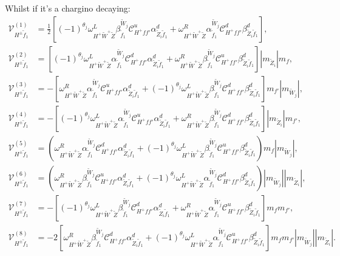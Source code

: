 \documentclass[final,3p,times,pdflatex]{elsarticle}
\begin{document}
Whilst if it's a chargino decaying:
\begin{align}
\mathcal{V}_{H^{\pm} \tilde{f}_1}^{(1)} &= \frac{1}{2}[(-1)^{\theta_j} \omega_{H^+ \tilde{W}^+ \tilde{Z}}^L \beta_{\tilde{f}_1}^{\tilde{W}_j} \mathcal{C}_{H^+ f f'}^u \alpha_{\tilde{Z}_i \tilde{f}_1}^{d} + \omega_{H^+ \tilde{W}^+ \tilde{Z}}^R \alpha_{\tilde{f}_1}^{\tilde{W}_j} \mathcal{C}_{H^+ f f'}^d \beta_{\tilde{Z}_i \tilde{f}_1}^{d}], \\
\mathcal{V}_{H^{\pm} \tilde{f}_1}^{(2)} &= [(-1)^{\theta_j}\omega_{H^+ \tilde{W}^+ \tilde{Z}}^L \alpha_{\tilde{f}_1}^{\tilde{W}_j} \mathcal{C}_{H^+ f f'}^d \alpha_{\tilde{Z}_i \tilde{f}_1}^{d} + \omega_{H^+ \tilde{W}^+ \tilde{Z}}^R \beta_{\tilde{f}_1}^{\tilde{W}_j} \mathcal{C}_{H^+ f f'}^u \beta_{\tilde{Z}_i \tilde{f}_1}^{d}]|m_{\tilde{Z}_i}|m_{f}, \\
\mathcal{V}_{H^{\pm} \tilde{f}_1}^{(3)} &= -[\omega_{H^+ \tilde{W}^+ \tilde{Z}}^R \alpha_{\tilde{f}_1}^{\tilde{W}_j} \mathcal{C}_{H^+ f f'}^u \alpha_{\tilde{Z}_i \tilde{f}_1}^{d} + (-1)^{\theta_j} \omega_{H^+ \tilde{W}^+ \tilde{Z}}^L \beta_{\tilde{f}_1}^{\tilde{W}_j} \mathcal{C}_{H^+ f f'}^d \beta_{\tilde{Z}_i \tilde{f}_1}^{d}]m_{f'}|m_{\tilde{W}_j}|, \\
\mathcal{V}_{H^{\pm} \tilde{f}_1}^{(4)} &= -[(-1)^{\theta_j} \omega_{H^+ \tilde{W}^+ \tilde{Z}}^L \alpha_{\tilde{f}_1}^{\tilde{W}_j} \mathcal{C}_{H^+ f f'}^u \alpha_{\tilde{Z}_i \tilde{f}_1}^{d} + \omega_{H^+ \tilde{W}^+ \tilde{Z}}^R \beta_{\tilde{f}_1}^{\tilde{W}_j} \mathcal{C}_{H^+ f f'}^d \beta_{\tilde{Z}_i \tilde{f}_1}^{d}]|m_{\tilde{Z}_i}|m_{f'}, \\
\mathcal{V}_{H^{\pm} \tilde{f}_1}^{(5)} &= (\omega_{H^+ \tilde{W}^+ \tilde{Z}}^R \alpha_{\tilde{f}_1}^{\tilde{W}_j} \mathcal{C}_{H^+ f f'}^d \alpha_{\tilde{Z}_i \tilde{f}_1}^{d} + (-1)^{\theta_j} \omega_{H^+ \tilde{W}^+ \tilde{Z}}^L  \beta_{\tilde{f}_1}^{\tilde{W}_j} \mathcal{C}_{H^+ f f'}^u \beta_{\tilde{Z}_i \tilde{f}_1}^{d})m_{f}|m_{\tilde{W}_j}|, \\
\mathcal{V}_{H^{\pm} \tilde{f}_1}^{(6)} &= (\omega_{H^+ \tilde{W}^+ \tilde{Z}}^R \beta_{\tilde{f}_1}^{\tilde{W}_j} \mathcal{C}_{H^+ f f'}^u \alpha_{\tilde{Z}_i \tilde{f}_1}^{d} + (-1)^{\theta_j} \omega_{H^+ \tilde{W}^+ \tilde{Z}}^L \alpha_{\tilde{f}_1}^{\tilde{W}_j} \mathcal{C}_{H^+ f f'}^d \beta_{\tilde{Z}_i \tilde{f}_1}^{d})|m_{\tilde{W}_j}||m_{\tilde{Z}_i}|, \\
\mathcal{V}_{H^{\pm} \tilde{f}_1}^{(7)} &= -[(-1)^{\theta_j} \omega_{H^+ \tilde{W}^+ \tilde{Z}}^L \beta_{\tilde{f}_1}^{\tilde{W}_j} \mathcal{C}_{H^+ f f'}^d \alpha_{\tilde{Z}_i \tilde{f}_1}^{d} + \omega_{H^+ \tilde{W}^+ \tilde{Z}}^R \alpha_{\tilde{f}_1}^{\tilde{W}_j} \mathcal{C}_{H^+ f f'}^u \beta_{\tilde{Z}_i \tilde{f}_1}^{d}]m_{f}m_{f'}, \\
\mathcal{V}_{H^{\pm} \tilde{f}_1}^{(8)} &= -2[\omega_{H^+ \tilde{W}^+ \tilde{Z}}^R \beta_{\tilde{f}_1}^{\tilde{W}_j} \mathcal{C}_{H^+ f f'}^d \alpha_{\tilde{Z}_i \tilde{f}_1}^{d} + (-1)^{\theta_j} \omega_{H^+ \tilde{W}^+ \tilde{Z}}^L \alpha_{\tilde{f}_1}^{\tilde{W}_j} \mathcal{C}_{H^+ f f'}^u \beta_{\tilde{Z}_i \tilde{f}_1}^{d}]m_{f}m_{f'}|m_{\tilde{W}_j}||m_{\tilde{Z}_i}|.
\end{align}
\end{document}
